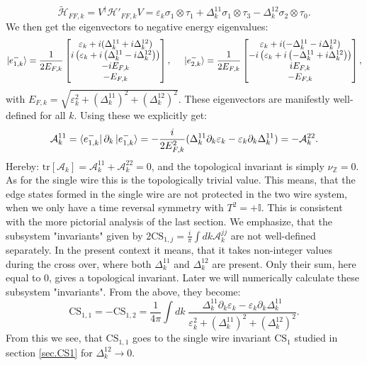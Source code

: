 \begin{equation}
\tilde{\mathcal{H}}_{FF,k} = V^\dagger\mathcal{H}'_{FF,k}V = \varepsilon_k \sigma_1\otimes \tau_1 + \Delta^{11}_k \sigma_1\otimes\tau_3 - \Delta^{12}_k\sigma_2\otimes\tau_0. \nonumber 
\end{equation}
We then get the eigenvectors to negative energy eigenvalues:
\begin{equation}
\ket{e^{-}_{1,k}} = \frac{1}{2E_{F,k}}\begin{bmatrix} \varepsilon_k + i(\Delta^{11}_k + i\Delta^{12}_k) \\ i\left(\varepsilon_k + i\left(\Delta^{11}_k - i\Delta^{12}_k\right)\right) \\ -iE_{F,k} \\ -E_{F,k} \end{bmatrix}, \hspace{0.5cm} \ket{e^{-}_{2,k}} = \frac{1}{2E_{F,k}}\begin{bmatrix} \varepsilon_k + i(-\Delta^{11}_k - i\Delta^{12}_k) \\ -i\left(\varepsilon_k + i\left(-\Delta^{11}_k + i\Delta^{12}_k\right)\right) \\ iE_{F,k} \\ -E_{F,k} \end{bmatrix},
\end{equation}
with $E_{F,k} = \sqrt{\varepsilon_k^2 + (\Delta^{11}_k)^2 + (\Delta^{12}_k)^2}$. These eigenvectors are manifestly well-defined for all $k$. Using these we explicitly get:
\begin{equation}
\mathcal{A}^{11}_k = \bra{e^{-}_{1,k}}\partial_k\ket{e^{-}_{1,k}} = -\frac{i}{2E_{F,k}^2}(\Delta^{11}_k\partial_k\varepsilon_k - \varepsilon_k\partial_k\Delta^{11}_k) = -\mathcal{A}^{22}_k. \nonumber
\end{equation}
Hereby: $\text{tr}[\mathcal{A}_k] = \mathcal{A}^{11}_k  + \mathcal{A}^{22}_k = 0$, and the topological invariant is simply $\nu_{\mathbb{Z}} = 0$. As for the single wire this is the topologically trivial value. This means, that the edge states formed in the single wire are not protected in the two wire system, when we only have a time reversal symmetry with $T^2 = +\mathbb{I}$. This is consistent with the more pictorial analysis of the last section. We emphasize, that the subsystem "invariants" given by $2\text{CS}_{1,j} = \frac{i}{\pi}\int dk \mathcal{A}^{jj}_k$ are not well-defined separately. In the present context it means, that it takes non-integer values during the cross over, where both $\Delta^{11}_k$ and $\Delta^{12}_k$ are present. Only their sum, here equal to $0$, gives a topological invariant. Later we will numerically calculate these subsystem "invariants". From the above, they become:
\begin{equation}
\text{CS}_{1,1} = - \text{CS}_{1,2} = \frac{1}{4\pi}\int dk \; \frac{\Delta^{11}_k\partial_k\varepsilon_k - \varepsilon_k\partial_k\Delta^{11}_k}{\varepsilon^2_k + (\Delta^{11}_k)^2 + (\Delta^{12}_k)^2}. 
\end{equation}
From this we see, that $\text{CS}_{1,1}$ goes to the single wire invariant $\text{CS}_1$ studied in section \ref{sec.CS1} for $\Delta^{12}_k \to 0$. 

